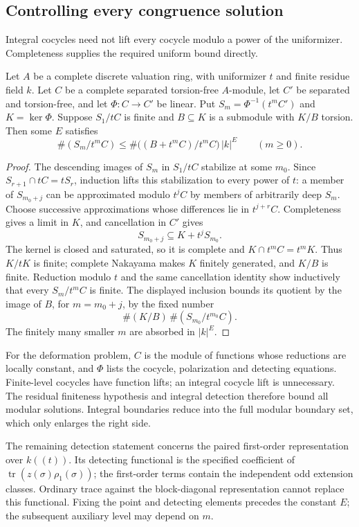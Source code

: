 \subsection{Controlling every congruence solution}

Integral cocycles need not lift every cocycle modulo a power of the
uniformizer. Completeness supplies the required uniform bound directly.

\begin{lemma}\label{shared-complete-solution-count}
Let $A$ be a complete discrete valuation ring, with uniformizer $t$ and
finite residue field $k$. Let $C$ be a complete separated torsion-free
$A$-module, let $C'$ be separated and torsion-free, and let
$\Phi:C\longrightarrow C'$ be linear. Put
$S_m=\Phi^{-1}(t^mC')$ and $K=\ker\Phi$. Suppose $S_1/tC$ is finite
and $B\subseteq K$ is a submodule with $K/B$ torsion. Then some $E$
satisfies
\[
 \#(S_m/t^mC)\leq
 \#\bigl((B+t^mC)/t^mC\bigr)\,|k|^E
 \qquad(m\geq0).
\]
\end{lemma}

\begin{proof}
The descending images of $S_m$ in $S_1/tC$ stabilize at some $m_0$.
Since $S_{r+1}\cap tC=tS_r$, induction lifts this stabilization to
every power of $t$: a member of $S_{m_0+j}$ can be approximated modulo
$t^jC$ by members of arbitrarily deep $S_m$. Choose successive
approximations whose differences lie in $t^{j+r}C$.
Completeness gives a limit in $K$, and cancellation in $C'$ gives
\[
                    S_{m_0+j}\subseteq K+t^jS_{m_0}.
\]
The kernel is closed and saturated, so it is complete and
$K\cap t^mC=t^mK$. Thus $K/tK$ is finite; complete Nakayama makes
$K$ finitely generated, and $K/B$ is finite. Reduction modulo $t$
and the same cancellation identity show inductively that every
$S_m/t^mC$ is finite. The displayed inclusion bounds its quotient by
the image of $B$, for $m=m_0+j$, by the fixed number
\[
             \#(K/B)\,\#(S_{m_0}/t^{m_0}C).
\]
The finitely many smaller $m$ are absorbed in $|k|^E$.
\end{proof}

For the deformation problem, $C$ is the module of functions whose
reductions are locally constant, and $\Phi$ lists the cocycle,
polarization and detecting equations. Finite-level cocycles have
function lifts; an integral cocycle lift is unnecessary. The residual
finiteness hypothesis and integral detection therefore bound all
modular solutions. Integral boundaries reduce into the full modular
boundary set, which only enlarges the right side.

The remaining detection statement concerns the paired first-order
representation over $k((t))$. Its detecting functional is the specified
coefficient of $\operatorname{tr}(z(\sigma)\rho_1(\sigma))$; the
first-order terms contain the independent odd extension classes.
Ordinary trace against the block-diagonal representation cannot replace
this functional. Fixing the point and detecting elements precedes the
constant $E$; the subsequent auxiliary level may depend on $m$.

